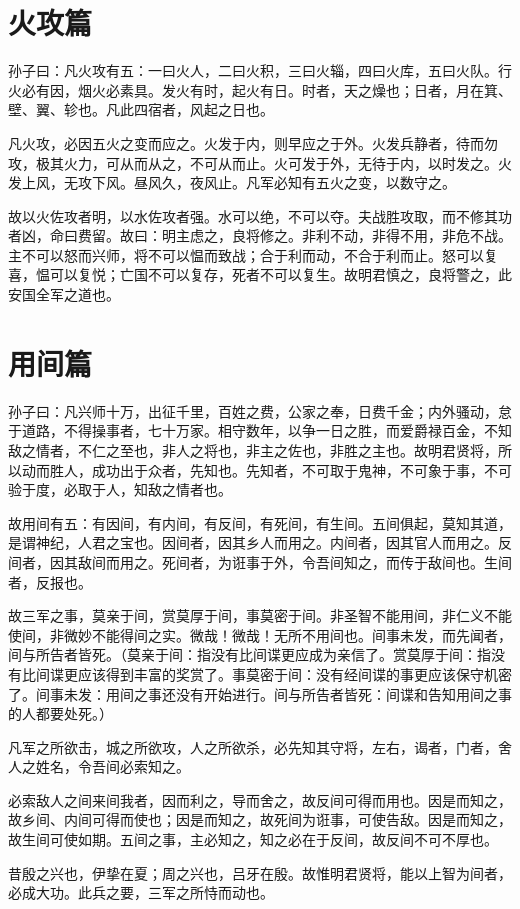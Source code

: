 \documentclass[UTF8]{ctexart}
\begin{document}
	\newpage
	\section{火攻篇}
	
	孙子曰：凡火攻有五：一曰火人，二曰火积，三曰火辎，四曰火库，五曰火队。行火必有因，烟火必素具。发火有时，起火有日。时者，天之燥也；日者，月在箕、壁、翼、轸也。凡此四宿者，风起之日也。
	
	凡火攻，必因五火之变而应之。火发于内，则早应之于外。火发兵静者，待而勿攻，极其火力，可从而从之，不可从而止。火可发于外，无待于内，以时发之。火发上风，无攻下风。昼风久，夜风止。凡军必知有五火之变，以数守之。
	
	故以火佐攻者明，以水佐攻者强。水可以绝，不可以夺。夫战胜攻取，而不修其功者凶，命曰费留。故曰：明主虑之，良将修之。非利不动，非得不用，非危不战。主不可以怒而兴师，将不可以愠而致战；合于利而动，不合于利而止。怒可以复喜，愠可以复悦；亡国不可以复存，死者不可以复生。故明君慎之，良将警之，此安国全军之道也。
	
	\newpage
	\section{用间篇}
	
	孙子曰：凡兴师十万，出征千里，百姓之费，公家之奉，日费千金；内外骚动，怠于道路，不得操事者，七十万家。相守数年，以争一日之胜，而爱爵禄百金，不知敌之情者，不仁之至也，非人之将也，非主之佐也，非胜之主也。故明君贤将，所以动而胜人，成功出于众者，先知也。先知者，不可取于鬼神，不可象于事，不可验于度，必取于人，知敌之情者也。
	
	故用间有五：有因间，有内间，有反间，有死间，有生间。五间俱起，莫知其道，是谓神纪，人君之宝也。因间者，因其乡人而用之。内间者，因其官人而用之。反间者，因其敌间而用之。死间者，为诳事于外，令吾间知之，而传于敌间也。生间者，反报也。
	
	故三军之事，莫亲于间，赏莫厚于间，事莫密于间。非圣智不能用间，非仁义不能使间，非微妙不能得间之实。微哉！微哉！无所不用间也。间事未发，而先闻者，间与所告者皆死。（莫亲于间：指没有比间谍更应成为亲信了。赏莫厚于间：指没有比间谍更应该得到丰富的奖赏了。事莫密于间：没有经间谍的事更应该保守机密了。间事未发：用间之事还没有开始进行。间与所告者皆死：间谍和告知用间之事的人都要处死。）
	
	凡军之所欲击，城之所欲攻，人之所欲杀，必先知其守将，左右，谒者，门者，舍人之姓名，令吾间必索知之。
	
	必索敌人之间来间我者，因而利之，导而舍之，故反间可得而用也。因是而知之，故乡间、内间可得而使也；因是而知之，故死间为诳事，可使告敌。因是而知之，故生间可使如期。五间之事，主必知之，知之必在于反间，故反间不可不厚也。
	
	昔殷之兴也，伊挚在夏；周之兴也，吕牙在殷。故惟明君贤将，能以上智为间者，必成大功。此兵之要，三军之所恃而动也。	
\end{document}
